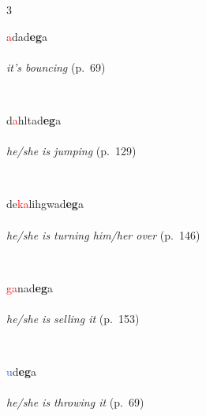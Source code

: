 \documentclass[oneside,openany]{book}%
\begin{document}
\noindent\begin{multicols}{3}%
\begin{minipage}[t]{\linewidth}
\raggedright\noindent \textcolor{Red}{a}dad\textbf{eg}a\\
\\
\noindent \textit{it's bouncing} (p.~69)
\end{minipage}\\[1em]%
\begin{minipage}[t]{\linewidth}
\raggedright\noindent d\textcolor{Red}{a}hltad\textbf{eg}a\\
\\
\noindent \textit{he/she is jumping} (p.~129)
\end{minipage}\\[1em]%
\begin{minipage}[t]{\linewidth}
\raggedright\noindent de\textcolor{Red}{ka}lihgwad\textbf{eg}a\\
\\
\noindent \textit{he/she is turning him/her over} (p.~146)
\end{minipage}\\[1em]%
\begin{minipage}[t]{\linewidth}
\raggedright\noindent \textcolor{Red}{ga}nad\textbf{eg}a\\
\\
\noindent \textit{he/she is selling it} (p.~153)
\end{minipage}\\[1em]%
\begin{minipage}[t]{\linewidth}
\raggedright\noindent \textcolor{RoyalBlue}{u}d\textbf{eg}a\\
\\
\noindent \textit{he/she is throwing it} (p.~69)
\end{minipage}\\[1em]%
\end{multicols}%
\vspace{1em}%
\needspace{1.5in}%
\end{document}
